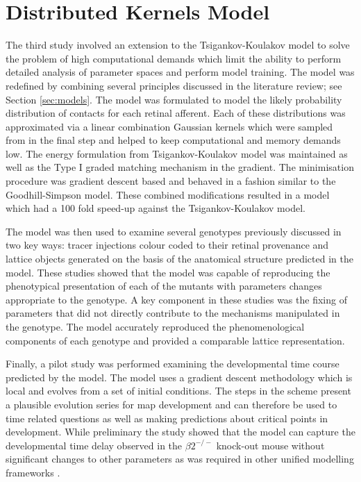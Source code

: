 \section{Distributed Kernels Model}
The third study involved an extension to the Tsigankov-Koulakov model to solve the problem of high computational demands which limit the ability to perform detailed analysis of parameter spaces and perform model training. The model was redefined by combining several principles discussed in the literature review; see Section \ref{sec:models}. The model was formulated to model the likely probability distribution of contacts for each retinal afferent. Each of these distributions was approximated via a linear combination Gaussian kernels which were sampled from in the final step and helped to keep computational and memory demands low. The energy formulation from Tsigankov-Koulakov model was maintained as well as the Type I graded matching mechanism in the gradient. The minimisation procedure was gradient descent based and behaved in a fashion similar to the Goodhill-Simpson model. These combined modifications resulted in a model which had a 100 fold speed-up against the Tsigankov-Koulakov model. 

The model was then used to examine several genotypes previously discussed in two key ways: tracer injections colour coded to their retinal provenance and lattice objects generated on the basis of the anatomical structure predicted in the model. These studies showed that the model was capable of reproducing the phenotypical presentation of each of the mutants with parameters changes appropriate to the genotype. A key component in these studies was the fixing of parameters that did not directly contribute to the mechanisms manipulated in the genotype. The model accurately reproduced the phenomenological components of each genotype and provided a comparable lattice representation. 

Finally, a pilot study was performed examining the developmental time course predicted by the model. The model uses a gradient descent methodology which is local and evolves from a set of initial conditions. The steps in the scheme present a plausible evolution series for map development and can therefore be used to time related questions as well as making predictions about critical points in development. While preliminary the study showed that the model can capture the developmental time delay observed in the $\beta2^{-/-}$ knock-out mouse without significant changes to other parameters as was required in other unified modelling frameworks \cite{Lyngholm2019-fs}. 

